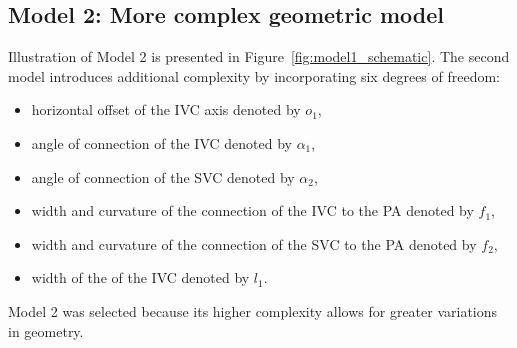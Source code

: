 \subsection*{Model 2: More complex geometric model}
Illustration of Model 2 is presented in Figure~\ref{fig:model1_schematic}. The second model introduces additional complexity by incorporating six degrees of freedom:
\begin{itemize}
	\item horizontal offset of the IVC axis denoted by $o_1$,
	\item angle of connection of the IVC denoted by $\alpha_1$,
	\item angle of connection of the  SVC denoted by $\alpha_2$,
	\item width and curvature of the connection of the IVC to the PA denoted by $f_1$,
	\item width and curvature of the connection of the SVC to the PA denoted by $f_2$,
	\item width of the of the IVC denoted by $l_1$.
\end{itemize}
Model 2 was selected because its higher complexity allows for greater variations in geometry.

